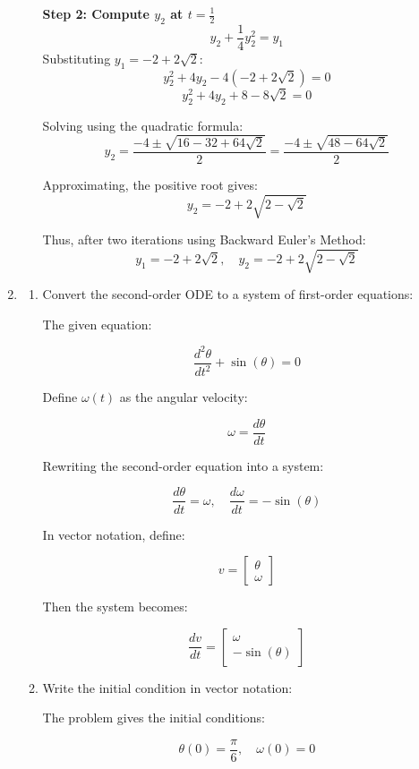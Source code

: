 \documentclass[12pt]{article}
\begin{document}
\begin{enumerate}
\begin{enumerate}
    \textbf{Step 2: Compute \( y_2 \) at \( t = \frac{1}{2} \)}
    \[
    y_2 + \frac{1}{4} y_2^2 = y_1
    \]
    Substituting \( y_1 = -2 + 2\sqrt{2} \):
    \[
    y_2^2 + 4 y_2 - 4(-2 + 2\sqrt{2}) = 0
    \]
    \[
    y_2^2 + 4y_2 + 8 - 8\sqrt{2} = 0
    \]

    Solving using the quadratic formula:
    \[
    y_2 = \frac{-4 \pm \sqrt{16 - 32 + 64\sqrt{2}}}{2} = \frac{-4 \pm \sqrt{48 - 64\sqrt{2}}}{2}
    \]

    Approximating, the positive root gives:
    \[
    y_2 = -2 + 2\sqrt{2 - \sqrt{2}}
    \]

    Thus, after two iterations using Backward Euler’s Method:
    \[
    y_1 = -2 + 2\sqrt{2}, \quad y_2 = -2 + 2\sqrt{2 - \sqrt{2}}
    \]

\end{enumerate}
\item 
\begin{enumerate}
    \item Convert the second-order ODE to a system of first-order equations:

    The given equation:

    \[
    \frac{d^2\theta}{dt^2} + \sin(\theta) = 0
    \]

    Define \( \omega(t) \) as the angular velocity:

    \[
    \omega = \frac{d\theta}{dt}
    \]

    Rewriting the second-order equation into a system:

    \[
    \frac{d\theta}{dt} = \omega, \quad \frac{d\omega}{dt} = -\sin(\theta)
    \]

    In vector notation, define:

    \[
    v =
    \begin{bmatrix}
    \theta \\
    \omega
    \end{bmatrix}
    \]

    Then the system becomes:

    \[
    \frac{dv}{dt} =
    \begin{bmatrix}
    \omega \\
    -\sin(\theta)
    \end{bmatrix}
    \]

    \item Write the initial condition in vector notation:

    The problem gives the initial conditions:

    \[
    \theta(0) = \frac{\pi}{6}, \quad \omega(0) = 0
    \]


\end{enumerate}
\end{enumerate}
\end{document}
